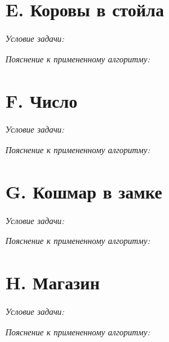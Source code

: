 \section{E. Коровы в стойла}
\textit{Условие задачи:} \par
\textit{Пояснение к примененному алгоритму:} \par
\BgThispage
\newpage

\section{F. Число}
\textit{Условие задачи:} \par
\textit{Пояснение к примененному алгоритму:} \par
\BgThispage
\newpage

\section{G. Кошмар в замке}
\textit{Условие задачи:} \par
\textit{Пояснение к примененному алгоритму:} \par
\BgThispage
\newpage

\section{H. Магазин}
\textit{Условие задачи:} \par
\textit{Пояснение к примененному алгоритму:} \par
\BgThispage
